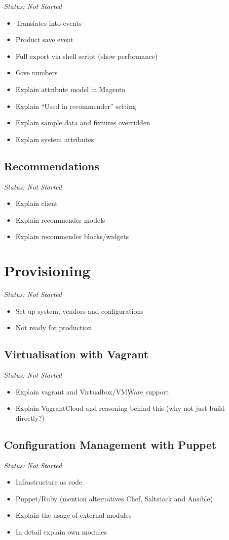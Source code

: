 \emph{Status: Not Started}

\begin{itemize}
\item Translates into events
\item Product save event
\item Full export via shell script (show performance)
\item Give numbers
\item Explain attribute model in Magento
\item Explain ``Used in recommender'' setting
\item Explain sample data and fixtures overridden
\item Explain system attributes
\end{itemize}

\subsection{Recommendations}

\emph{Status: Not Started}

\begin{itemize}
\item Explain client
\item Explain recommender models
\item Explain recommender blocks/widgets
\end{itemize}

\section{Provisioning}

\emph{Status: Not Started}

\begin{itemize}
\item Set up system, vendors and configurations
\item Not ready for production
\end{itemize}

\subsection{Virtualisation with Vagrant}

\emph{Status: Not Started}

\begin{itemize}
\item Explain vagrant and Virtualbox/VMWare support
\item Explain VagrantCloud and reasoning behind this (why not just build directly?)
\end{itemize}

\subsection{Configuration Management with Puppet}

\emph{Status: Not Started}

\begin{itemize}
\item Infrastructure as code
\item Puppet/Ruby (mention alternatives Chef, Saltstack and Ansible)
\item Explain the usage of external modules
\item In detail explain own modules
\end{itemize}
